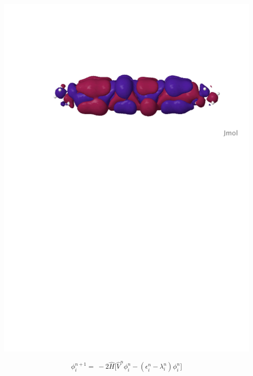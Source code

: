 \documentclass[mathserif, 10pt]{beamer}
\begin{document}
\begin{frame}
\begin{columns}
\begin{column}[b]{0.48\linewidth}
    \includegraphics[scale=0.25, clip, viewport = 80 560 600 700]{figures/can_orb_2.pdf}\\

    \vspace{2mm}

    \begin{equation}
        \nonumber
        \phi_i^{n+1} =\ -2\hat{H}\Bigg[\hat{V}^n\phi_i^n
        - (\epsilon^n_i - \lambda^n_i)\phi_i^n\Bigg]
    \end{equation}
    \end{column}


\end{columns}
\end{frame}
\end{document}
